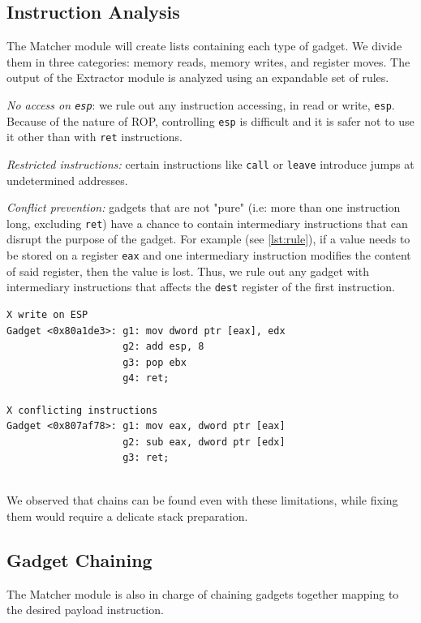 \documentclass[10pt,twocolumn]{article}
\begin{document}
\subsection{Instruction Analysis}

The Matcher module will create lists containing each type of gadget. We
divide them in three categories: memory reads, memory writes, and register
moves. The output of the Extractor module is analyzed using an expandable set
of rules.

\textit{No access on \texttt{esp}}: we rule out any instruction accessing, in
read or write, \texttt{esp}. Because of the nature of ROP, controlling
\texttt{esp} is difficult and it is safer not to use it other than with \texttt{ret}
instructions.

\textit{Restricted instructions:} certain instructions like \texttt{call} or
\texttt{leave} introduce jumps at undetermined addresses.

\textit{Conflict prevention:} gadgets that are not "pure" (i.e: more than one
instruction long, excluding \texttt{ret}) have a chance to contain intermediary
instructions that can disrupt the purpose of the gadget. For example (see
\autoref{lst:rule}), if a
value needs to be stored on a register \texttt{eax} and one intermediary
instruction modifies the content of said register, then the value is lost.
Thus, we rule out any gadget with intermediary instructions that affects the
\texttt{dest} register of the first instruction.


\begin{lstlisting}[float=h,aboveskip=\medskipamount,belowskip=0pt,caption=Rule
verification,label=lst:rule]
X write on ESP
Gadget <0x80a1de3>: g1: mov dword ptr [eax], edx
                    g2: add esp, 8
                    g3: pop ebx
                    g4: ret;

X conflicting instructions
Gadget <0x807af78>: g1: mov eax, dword ptr [eax]
                    g2: sub eax, dword ptr [edx]
                    g3: ret;


\end{lstlisting}

We observed that chains can be found even with these limitations, while fixing
them would require a delicate stack preparation.


\subsection{Gadget Chaining}

The Matcher module is also in charge of chaining gadgets together mapping to
the desired payload instruction.
\end{document}
